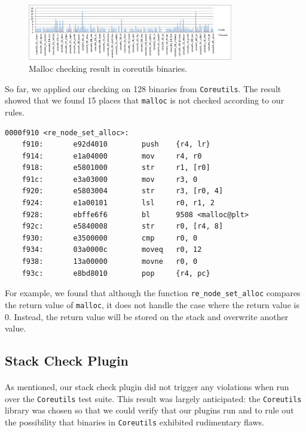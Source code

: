 \documentclass[letterpaper,11pt]{article}
\begin{document}
\begin{figure}[h!]
      \caption{Malloc checking result in coreutils binaries.}
        \centering
    \includegraphics[width=0.8\textwidth]{malloccheckplot}
\end{figure}
So far, we applied our checking on 128 binaries from \texttt{Coreutils}. The
result showed that we found 15 places that \texttt{malloc} is not checked
according to our rules.
\begin{center}
\lstset{language=C, label=strcpy_asm,
caption=Function re\_node\_set\_alloc, breaklines=true, basicstyle=\tiny, numbers=none}
\begin{lstlisting}
0000f910 <re_node_set_alloc>:
    f910:       e92d4010        push    {r4, lr}
    f914:       e1a04000        mov     r4, r0
    f918:       e5801000        str     r1, [r0]
    f91c:       e3a03000        mov     r3, 0
    f920:       e5803004        str     r3, [r0, 4]
    f924:       e1a00101        lsl     r0, r1, 2
    f928:       ebffe6f6        bl      9508 <malloc@plt>
    f92c:       e5840008        str     r0, [r4, 8]
    f930:       e3500000        cmp     r0, 0
    f934:       03a0000c        moveq   r0, 12
    f938:       13a00000        movne   r0, 0
    f93c:       e8bd8010        pop     {r4, pc}
\end{lstlisting}
\end{center}
For example, we found that although the function \texttt{re\_node\_set\_alloc}
compares the return value of \texttt{malloc}, it does not handle the case
where the return value is 0. Instead, the return value will be stored on the
stack and overwrite another value.

\subsection{Stack Check Plugin}

\paragraph{}
As mentioned, our stack check plugin did not trigger any violations when run
over the \texttt{Coreutils} test suite. This result was largely anticipated:
the \texttt{Coreutils} library was chosen so that we could verify that our
plugins run and to rule out the possibility that binaries in \texttt{Coreutils}
exhibited rudimentary flaws.
\end{document}
